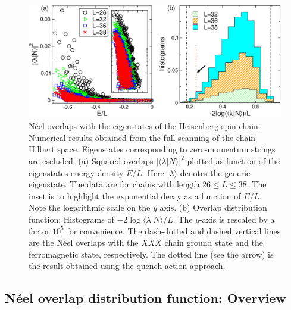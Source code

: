 \documentclass[11pt]{iopart}
\begin{document}
\begin{figure}[t]
\begin{center}
\includegraphics[width=.9\textwidth]{./draft_figs/Neel_overlaps}
\end{center}
\caption{ N\'eel overlaps with the eigenstates of the Heisenberg spin 
 chain: Numerical results obtained from the full scanning of the chain 
 Hilbert space. Eigenstates corresponding to zero-momentum strings are 
 escluded. (a) Squared overlaps $|\langle\lambda|N\rangle|^2$ plotted as 
 function of the eigenstates energy density $E/L$. Here $|\lambda\rangle$ 
 denotes the generic eigenstate. The data are for chains with length $26
 \le L\le 38$. The inset is to highlight the exponential decay as a 
 function of $E/L$. Note the logarithmic scale on the $y$ axis. (b) 
 Overlap distribution function: Histograms of $-2\log\langle\lambda|N\rangle/L$. 
 The $y$-axis is rescaled by a factor $10^5$ for convenience. The dash-dotted 
 and dashed vertical lines are the N\'eel overlaps with the $XXX$ chain ground 
 state and the ferromagnetic state, respectively. The dotted line (see 
 the arrow) is the result obtained using the quench action approach. 
}
\label{fig0:neel-ov}
\end{figure}


\subsection{N\'eel overlap distribution function: Overview}
\label{sec:5.1}
\end{document}
